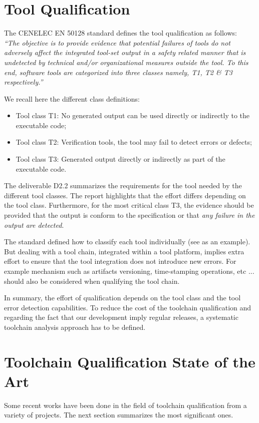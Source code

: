 \section{Tool Qualification}
\label{sec-1-1}


The CENELEC EN 50128 standard \cite{standard_railway_2011} defines the tool
qualification as follows:\\
{\it ``The objective is to provide evidence that potential
failures of tools do not adversely affect the integrated tool-set output in a
safety related manner that is undetected by technical and/or organizational
measures outside the tool. To this end, software tools are categorized into
three classes namely, T1, T2 \& T3 respectively.''}

We recall here the different class definitions:
\begin{itemize}
\item Tool class T1: No generated output can be used directly or indirectly to the
  executable code;
\item Tool class T2: Verification tools, the tool may fail to detect errors or
  defects;
\item Tool class T3: Generated output directly or indirectly  as part of the
  executable code.
\end{itemize}
The deliverable D2.2 \cite{pokam_report_2013} summarizes the requirements for the
tool needed by the different tool classes. The report highlights that the
effort differs depending on the tool class. Furthermore, for
the most critical class T3,  the evidence should be provided that the output is
conform to the specification or that \emph{any failure in the output
  are detected}. 

The standard defined how to classify each tool individually (see
\cite{nielsen_efficient_2012,huang_test_2013} as an example).  But dealing with a tool
chain, integrated within a tool platform, implies extra effort to
ensure that the tool integration does not introduce new errors. For
example mechanism such as artifacts versioning, time-stamping
operations, etc ... should also be considered when qualifying the tool
chain.

In summary, the effort of qualification depends on the tool class and the tool
error detection capabilities. To reduce the cost of the toolchain qualification
and regarding the fact that our development imply regular releases, a systematic
toolchain analysis approach has to be defined.
 
\section{Toolchain Qualification State of the Art}
\label{sec-1-2}
Some recent works have been done in the field of toolchain
qualification from a variety of projects. The next section summarizes
the most significant ones.

